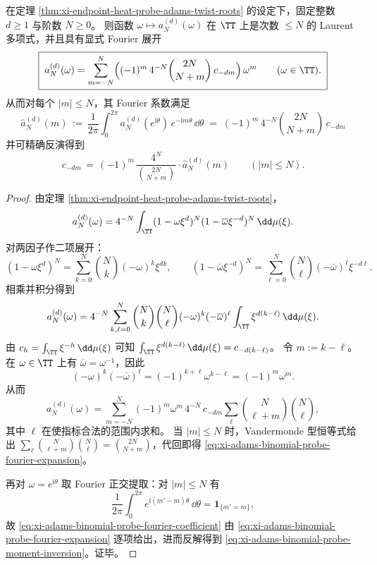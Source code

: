 \begin{theorem}\label{thm:xi-adams-binomial-probe-fourier-diagonalization}
在定理 \ref{thm:xi-endpoint-heat-probe-adams-twist-roots} 的设定下，固定整数 \(d\ge 1\) 与阶数 \(N\ge 0\)。
则函数 \(\omega\mapsto a_N^{(d)}(\omega)\) 在 \(\TT\) 上是次数 \(\le N\) 的 Laurent 多项式，并且具有显式 Fourier 展开
\begin{equation}\label{eq:xi-adams-binomial-probe-fourier-expansion}
\boxed{\;
a_N^{(d)}(\omega)=\sum_{m=-N}^{N}\Bigl((-1)^m\,4^{-N}\binom{2N}{N+m}\,c_{-dm}\Bigr)\,\omega^{m}\qquad(\omega\in\TT).\;}
\end{equation}
从而对每个 \(|m|\le N\)，其 Fourier 系数满足
\begin{equation}\label{eq:xi-adams-binomial-probe-fourier-coefficient}
\boxed{\;
\widehat a_{N}^{(d)}(m)
\,:=\,
\frac{1}{2\pi}\int_{0}^{2\pi}a_N^{(d)}(e^{\mathrm{i}\theta})\,e^{-\mathrm{i}m\theta}\,\dd\theta
\;=\;
(-1)^m\,4^{-N}\binom{2N}{N+m}\,c_{-dm}\;}
\end{equation}
并可精确反演得到
\begin{equation}\label{eq:xi-adams-binomial-probe-moment-inversion}
\boxed{\;
c_{-dm}
\,=\,
(-1)^m\,\frac{4^{N}}{\binom{2N}{N+m}}\cdot \widehat a_{N}^{(d)}(m)\qquad(|m|\le N).\;}
\end{equation}
\end{theorem}
\begin{proof}
由定理 \ref{thm:xi-endpoint-heat-probe-adams-twist-roots}，
\[
a_N^{(d)}(\omega)
=4^{-N}\int_{\TT}(1-\omega\xi^{d})^{N}(1-\overline{\omega}\xi^{-d})^{N}\,\dd\mu(\xi).
\]
对两因子作二项展开：
\[
(1-\omega\xi^{d})^{N}=\sum_{k=0}^{N}\binom Nk(-\omega)^{k}\xi^{dk},
\qquad
(1-\overline{\omega}\xi^{-d})^{N}=\sum_{\ell=0}^{N}\binom N\ell(-\overline{\omega})^{\ell}\xi^{-d\ell}.
\]
相乘并积分得到
\[
a_N^{(d)}(\omega)
=4^{-N}\sum_{k,\ell=0}^{N}\binom Nk\binom N\ell (-\omega)^{k}(-\overline{\omega})^{\ell}
\int_{\TT}\xi^{d(k-\ell)}\,\dd\mu(\xi).
\]
由 \(c_h=\int_{\TT}\xi^{-h}\,\dd\mu(\xi)\) 可知
\(
\int_{\TT}\xi^{d(k-\ell)}\,\dd\mu(\xi)=c_{-d(k-\ell)}
\)。
令 \(m:=k-\ell\)。在 \(\omega\in\TT\) 上有 \(\overline{\omega}=\omega^{-1}\)，因此
\[
(-\omega)^{k}(-\overline{\omega})^{\ell}=(-1)^{k+\ell}\omega^{k-\ell}=(-1)^{m}\omega^{m}.
\]
从而
\[
a_N^{(d)}(\omega)
=\sum_{m=-N}^{N}(-1)^{m}\omega^{m}\,4^{-N}\,c_{-dm}\sum_{\ell}\binom N{\ell+m}\binom N\ell,
\]
其中 \(\ell\) 在使指标合法的范围内求和。
当 \(|m|\le N\) 时，Vandermonde 型恒等式给出
\(
\sum_{\ell}\binom N{\ell+m}\binom N\ell=\binom{2N}{N+m}
\)，代回即得 \eqref{eq:xi-adams-binomial-probe-fourier-expansion}。
\par
再对 \(\omega=e^{\mathrm{i}\theta}\) 取 Fourier 正交提取：对 \(|m|\le N\) 有
\[
\frac{1}{2\pi}\int_{0}^{2\pi}e^{\mathrm{i}(m'-m)\theta}\,\dd\theta=\mathbf 1_{\{m'=m\}},
\]
故 \eqref{eq:xi-adams-binomial-probe-fourier-coefficient} 由 \eqref{eq:xi-adams-binomial-probe-fourier-expansion} 逐项给出，进而反解得到 \eqref{eq:xi-adams-binomial-probe-moment-inversion}。证毕。
\end{proof}

